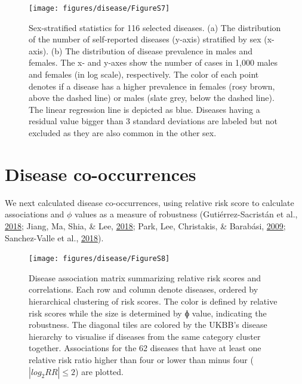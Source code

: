 \documentclass[12pt,twoside]{unicam}
\begin{document}
\begin{figure}

{\centering \texttt{[image: figures/disease/FigureS7]} 

}

\caption[Sex-stratified statistics for the 116 diseases.]{Sex-stratified statistics for 116 selected diseases. (a) The distribution of the number of self-reported diseases (y-axis) stratified by sex (x-axis). (b) The distribution of disease prevalence in males and females. The x- and y-axes show the number of cases in 1,000 males and females (in log scale), respectively. The color of each point denotes if a disease has a higher prevalence in females (rosy brown, above the dashed line) or males (slate grey, below the dashed line). The linear regression line is depicted as blue. Diseases having a residual value bigger than 3 standard deviations are labeled but not excluded as they are also common in the other sex.}\label{fig:disFigS7}
\end{figure}

\hypertarget{disease-co-occurrences}{%
\section{Disease co-occurrences}\label{disease-co-occurrences}}

We next calculated disease co-occurrences, using relative risk score to calculate associations and \(\phi\) values as a measure of robustness (Gutiérrez-Sacristán et al., \protect\hyperlink{ref-Gutierrez-Sacristan2018}{2018}; Jiang, Ma, Shia, \& Lee, \protect\hyperlink{ref-Jiang2018}{2018}; Park, Lee, Christakis, \& Barabási, \protect\hyperlink{ref-Park2009}{2009}; Sanchez-Valle et al., \protect\hyperlink{ref-Sanchez-Valle2018}{2018}).

\begin{figure}

{\centering \texttt{[image: figures/disease/FigureS8]} 

}

\caption[Disease association matrix summarizing relative risk scores and correlations.]{Disease association matrix summarizing relative risk scores and correlations. Each row and column denote diseases, ordered by hierarchical clustering of risk scores. The color is defined by relative risk scores while the size is determined by ɸ value, indicating the robustness. The diagonal tiles are colored by the UKBB's disease hierarchy to visualise if diseases from the same category cluster together. Associations for the 62 diseases that have at least one relative risk ratio higher than four or lower than minus four ($|log_2RR| ≤ 2$) are plotted.}\label{fig:disFigS8}
\end{figure}
\end{document}
